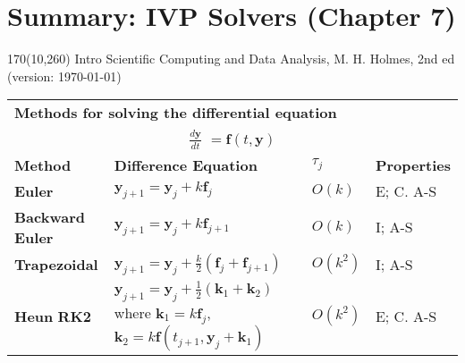 \documentclass[11pt]{article}
\begin{document}
\pagestyle{empty}

\section*{Summary: IVP Solvers (Chapter 7)}

\begin{textblock}{170}(10,260)
\noindent \textsf{{\small Intro Scientific Computing and Data Analysis, M. H. Holmes, 2nd ed (version: \today)}}
\end{textblock}

\bigskip
 \begin{table}[H]
\centering
\renewcommand\arraystretch{2.4}
\renewcommand\tabcolsep{6pt}
\begin{tabular}{|p{0.9in}|p{2.7in}|p{0.4in}|p{0.9in}|} \hline
\multicolumn{4}{|l|}{\textbf{Methods for solving the differential equation}}\\
\multicolumn{4}{|c|}{  ${\displaystyle \frac{d\mathbf{y}}{dt} }$ {\normalsize $=\mathbf{f}(t,\mathbf{y})$} \vspace{2pt}}\\ \hline
\textbf{Method} & \textbf{Difference Equation} & $\tau_j$ & \textbf{Properties}\\ \hline
\textbf{Euler} & ${\displaystyle \mathbf{y}_{j+1}=\mathbf{y}_{j}+k\mathbf{f}_{j}}$ & $O(k)$ & E; C. A-S\\ \hline
\textbf{Backward Euler} &${\displaystyle \mathbf{y}_{j+1}=\mathbf{y}_{j}+k\mathbf{f}_{j+1}}$ & $O(k)$ & I;  A-S\\ \hline
\textbf{Trapezoidal} 
& ${\displaystyle \mathbf{y}_{j+1}=\mathbf{y}_{j}+\frac{k}{2}(\mathbf{f}_{j}+\mathbf{f}_{j+1})}$ 
& $O(k^{2})$ & I;  A-S\\ \hline

\textbf{Heun} \newline \textbf{RK2} 
& ${\displaystyle \mathbf{y}_{j+1}=\mathbf{y}_{j}+\frac{1}{2}(\mathbf{k}_{1}+\mathbf{k}_{2})}$   \vspace{2pt}  \newline where   \vspace{2pt}  \newline
${\displaystyle \mathbf{k}_{1}=k\mathbf{f}_{j}}$,  \,\,  ${\displaystyle \mathbf{k}_{2}=k\mathbf{f}(t_{j+1},\mathbf{y}_{j}+\mathbf{k}_{1})}$ 
& $O(k^{2})$ 
& E;  C. A-S\\ \hline


\end{tabular}
\end{table}
\end{document}
